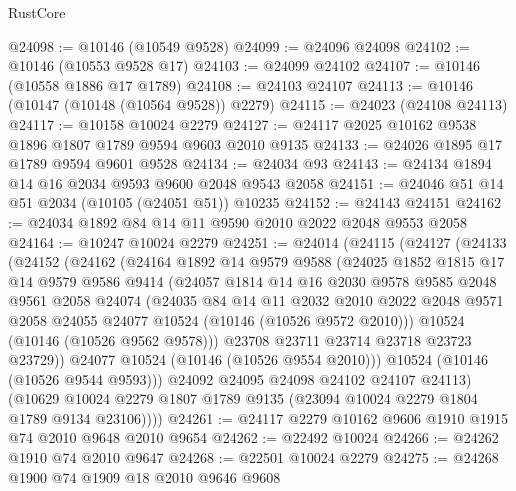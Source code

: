 \begin{lexlean}{RustCore}
\begin{coremodule}
@24098 := @10146 (@10549 @9528)
@24099 := @24096 @24098
@24102 := @10146 (@10553 @9528 @17)
@24103 := @24099 @24102
@24107 := @10146 (@10558 @1886 @17 @1789)
@24108 := @24103 @24107
@24113 := @10146 (@10147 (@10148 (@10564 @9528)) @2279)
@24115 := @24023 (@24108 @24113)
@24117 := @10158 @10024 @2279
@24127 := @24117 @2025 @10162 @9538 @1896 @1807 @1789 @9594 @9603 @2010 @9135
@24133 := @24026 @1895 @17 @1789 @9594 @9601 @9528
@24134 := @24034 @93
@24143 := @24134 @1894 @14 @16 @2034 @9593 @9600 @2048 @9543 @2058
@24151 := @24046 @51 @14 @51 @2034 (@10105 (@24051 @51)) @10235
@24152 := @24143 @24151
@24162 := @24034 @1892 @84 @14 @11 @9590 @2010 @2022 @2048 @9553 @2058
@24164 := @10247 @10024 @2279
@24251 := @24014
    (@24115
      (@24127
        (@24133
          (@24152
            (@24162
              (@24164
                @1892
                @14
                @9579
                @9588
                (@24025
                  @1852
                  @1815
                  @17
                  @14
                  @9579
                  @9586
                  @9414
                  (@24057
                    @1814
                    @14
                    @16
                    @2030
                    @9578
                    @9585
                    @2048
                    @9561
                    @2058
                    @24074
                    (@24035
                      @84
                      @14
                      @11
                      @2032
                      @2010
                      @2022
                      @2048
                      @9571
                      @2058
                      @24055
                      @24077
                      @10524
                      (@10146 (@10526 @9572 @2010)))
                    @10524
                    (@10146 (@10526 @9562 @9578)))
                  @23708
                  @23711
                  @23714
                  @23718
                  @23723
                  @23729))
              @24077
              @10524
              (@10146 (@10526 @9554 @2010)))
            @10524
            (@10146 (@10526 @9544 @9593)))
          @24092
          @24095
          @24098
          @24102
          @24107
          @24113)
        (@10629 @10024 @2279 @1807 @1789 @9135 (@23094 @10024 @2279 @1804 @1789 @9134 @23106))))
@24261 := @24117 @2279 @10162 @9606 @1910 @1915 @74 @2010 @9648 @2010 @9654
@24262 := @22492 @10024
@24266 := @24262 @1910 @74 @2010 @9647
@24268 := @22501 @10024 @2279
@24275 := @24268 @1900 @74 @1909 @18 @2010 @9646 @9608

\end{coremodule}
\end{lexlean}
